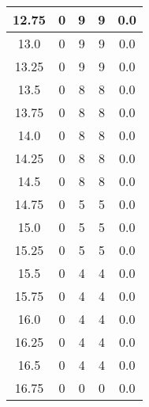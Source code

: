 \documentclass[letterpaper, 12pt]{article}
\begin{document}
\begin{longtable}{|c|c|c|c|c|}
\hline
12.75 & 0 & 9 & 9 & 0.0 \\
\hline
13.0 & 0 & 9 & 9 & 0.0 \\
\hline
13.25 & 0 & 9 & 9 & 0.0 \\
\hline
13.5 & 0 & 8 & 8 & 0.0 \\
\hline
13.75 & 0 & 8 & 8 & 0.0 \\
\hline
14.0 & 0 & 8 & 8 & 0.0 \\
\hline
14.25 & 0 & 8 & 8 & 0.0 \\
\hline
14.5 & 0 & 8 & 8 & 0.0 \\
\hline
14.75 & 0 & 5 & 5 & 0.0 \\
\hline
15.0 & 0 & 5 & 5 & 0.0 \\
\hline
15.25 & 0 & 5 & 5 & 0.0 \\
\hline
15.5 & 0 & 4 & 4 & 0.0 \\
\hline
15.75 & 0 & 4 & 4 & 0.0 \\
\hline
16.0 & 0 & 4 & 4 & 0.0 \\
\hline
16.25 & 0 & 4 & 4 & 0.0 \\
\hline
16.5 & 0 & 4 & 4 & 0.0 \\
\hline
16.75 & 0 & 0 & 0 & 0.0 \\
\hline
\end{longtable}
\end{document}
